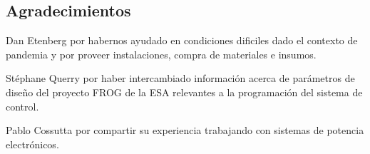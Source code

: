 \documentclass[11pt, titlepage]{article}
\begin{document}
\newpage



\null\newpage
\clearpage



\null\newpage
\clearpage



\null\newpage
\clearpage



\null\newpage
\clearpage




\null\newpage
\clearpage



\null\newpage
\clearpage



\null\newpage
\clearpage




\null\newpage
\clearpage



\null\newpage
\clearpage



\null\newpage
\clearpage

\subsection*{Agradecimientos}
Dan Etenberg por habernos ayudado en condiciones dificiles dado el contexto de pandemia y por proveer instalaciones, compra de materiales e insumos. 

\medskip

Stéphane Querry por haber intercambiado información acerca de parámetros de diseño del proyecto FROG de la ESA relevantes a la programación del sistema de control.

\medskip

Pablo Cossutta por compartir su experiencia trabajando con sistemas de potencia electrónicos. 



% 
%

\null\newpage
\clearpage


\end{document}
